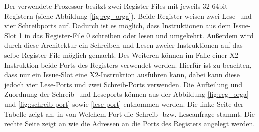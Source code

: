 %			
Der verwendete Prozessor besitzt zwei Register-Files mit jeweils 32 64bit-Registern (siehe Abbildung \ref{fig:reg_orga}). Beide Register weisen zwei Lese- und vier Schreibports auf. Dadurch ist es möglich, dass Instruktionen aus dem Issue-Slot 1 in das Register-File 0 schreiben oder lesen und umgekehrt. Außerdem wird durch diese Architektur ein Schreiben und Lesen zweier Instruktionen auf das selbe Register-File möglich gemacht. Des Weiteren können im Falle einer X2-Instruktion beide Ports des Registers verwendet werden. Hierfür ist zu beachten, dass nur ein Issue-Slot eine X2-Instruktion ausführen kann, dabei kann diese jedoch vier Lese-Ports und zwei Schreib-Ports verwenden. Die Aufteilung und  Zuordnung der Schreib- und Leseports können aus der Abbildung \ref{fig:reg_orga} und \ref{fig::schreib-port} sowie \ref{lese-port} entnommen werden. Die linke Seite der Tabelle zeigt an, in von Welchem Port die Schreib- bzw. Leseanfrage stammt. Die rechte Seite zeigt an wie die Adressen an die Ports des Registers angelegt werden.

